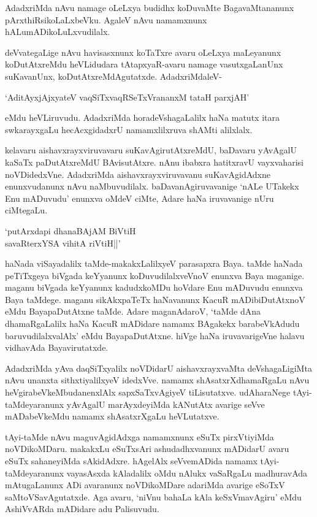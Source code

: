 AdadxriMda nAvu namage oLeLxya budidhx koDuvaMte BagavaMtananunx pArxthiRsikoLaLxbeVku. AgaleV nAvu namamxnunx hALumADikoLuLxvudilalx.

deVvategaLige nAvu havisasxnunx koTaTxre avaru oLeLxya maLeyanunx koDutAtxreMdu heVLidudara tAtapxyaR-avaru namage vasutxgaLanUnx suKavanUnx,  koDutAtxreMdAgutatxde. AdadxriMdaleV-

\begin{shloka}
`AditAyxjAjxyateV vaqSiTxvaqRSeTxVrananxM tataH parxjAH'
\end{shloka}

\noindent eMdu heVLiruvudu. AdadxriMda horadeVshagaLalilx haNa matutx itara swkarayxgaLu hecAcxgidadxrU namamxlilxruva shAMti alilxlalx.

kelavaru aishavxrayxviruvavaru suKavAgirutAtxreMdU, baDavaru yAvAgalU kaSaTx paDutAtxreMdU BAvisutAtxre. nAnu ibabxra hatitxravU vayxvaharisi noVDidedxVne. AdadxriMda aishavxrayxviruvavanu suKavAgidAdxne enunxvudanunx nAvu naMbuvudilalx. baDavanAgiruvavanige `nALe UTakekx Enu mADuvudu' enunxva oMdeV ciMte, Adare haNa iruvavanige nUru ciMtegaLu.

\begin{shloka}
`putArxdapi dhanaBAjAM BiVtiH\\
savaRterxYSA vihitA riVtiH||'
\end{shloka}

haNada viSayadalilx taMde-makakxLalilxyeV parasapxra Baya. taMde haNada peTiTxgeya biVgada keYyanunx koDuvudilalxveVnoV enunxva Baya maganige. maganu biVgada keYyanunx kadudxkoMDu hoVdare Enu mADuvudu enunxva Baya taMdege. maganu sikAkxpaTeTx haNavanunx KacuR mADibiDutAtxnoV eMdu BayapaDutAtxne taMde. Adare maganAdaroV, `taMde dAna dhamaRgaLalilx haNa KacuR mADidare namamx BAgakekx barabeVkAdudu baruvudilalxvalAlx' eMdu BayapaDutAtxne. hiVge haNa iruvavarigeVne halavu vidhavAda Bayavirutatxde.

AdadxriMda yAva daqSiTxyalilx noVDidarU aishavxrayxvaMta deVshagaLigiMta nAvu unanxta sithxtiyalilxyeV idedxVve. namamx shAsatxrXdhamaRgaLu nAvu heVgirabeVkeMbudanenxlAlx sapxSaTxvAgiyeV tiLisutatxve. udAharaNege tAyi-taMdeyaranunx yAvAgalU marAyxdeyiMda kANutAtx avarige seVve mADabeVkeMdu namamx shAsatxrXgaLu heVLutatxve.

tAyi-taMde nAvu maguvAgidAdxga namamxnunx eSuTx pirxVtiyiMda noVDikoMDaru. makakxLu eSuTxsAri ashudadhxvanunx mADidarU avaru eSuTx sahaneyiMda sAkidAdxre. hAgelAlx seVvemADida namamx tAyi-taMdeyaranunx vayasAsxda kAladalilx oMdu nAlukx vaSaRgaLu madhuravAda mAtugaLanunx ADi avaranunx noVDikoMDare adariMda avarige eSoTxV saMtoVSavAgutatxde. Aga avaru, `niVnu bahaLa kAla keSxVmavAgiru' eMdu AshiVvARda mADidare adu Palisuvudu.

